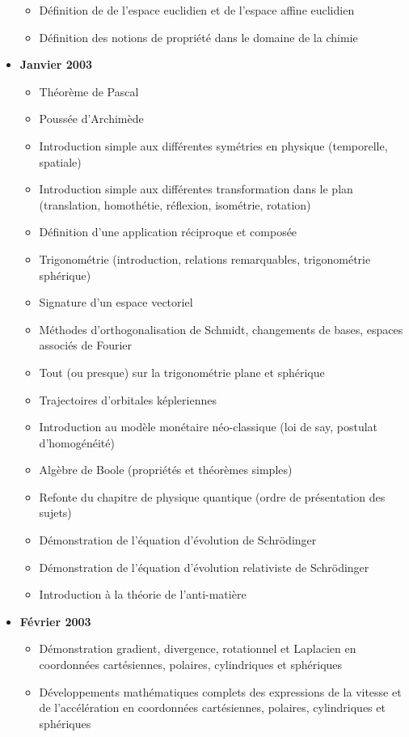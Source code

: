 \begin{itemize}
\begin{itemize}[noitemsep]
				\item Définition de de l'espace euclidien et de l'espace affine euclidien
				\item Définition des notions de propriété dans le domaine de la chimie
			\end{itemize}
			\item \textbf{Janvier 2003}
			\begin{itemize}[noitemsep]
				\item Théorème de Pascal
				\item Poussée d'Archimède
				\item Introduction simple aux différentes symétries en physique (temporelle, spatiale)
				\item Introduction simple aux différentes transformation dans le plan (translation, homothétie, réflexion, isométrie, rotation)
				\item Définition d'une application réciproque et composée
				\item Trigonométrie (introduction, relations remarquables, trigonométrie sphérique)
				\item Signature d'un espace vectoriel
				\item Méthodes d'orthogonalisation de Schmidt, changements de bases, espaces associés de Fourier
				\item Tout (ou presque) sur la trigonométrie plane et sphérique
				\item Trajectoires d'orbitales képleriennes
				\item Introduction au modèle monétaire néo-classique (loi de say, postulat d'homogénéité)
				\item Algèbre de Boole (propriétés et théorèmes simples)
				\item Refonte du chapitre de physique quantique (ordre de présentation des sujets)
				\item Démonstration de l'équation d'évolution de Schrödinger
				\item Démonstration de l'équation d'évolution relativiste de Schrödinger
				\item Introduction à la théorie de l'anti-matière
			\end{itemize}
		\item \textbf{Février 2003}
				\begin{itemize}[noitemsep]
				\item Démonstration gradient, divergence, rotationnel et Laplacien en coordonnées cartésiennes, polaires, cylindriques et sphériques
				\item Développements mathématiques complets des expressions de la vitesse et de l'accélération en coordonnées cartésiennes, polaires, cylindriques et sphériques

\end{itemize}
\end{itemize}
